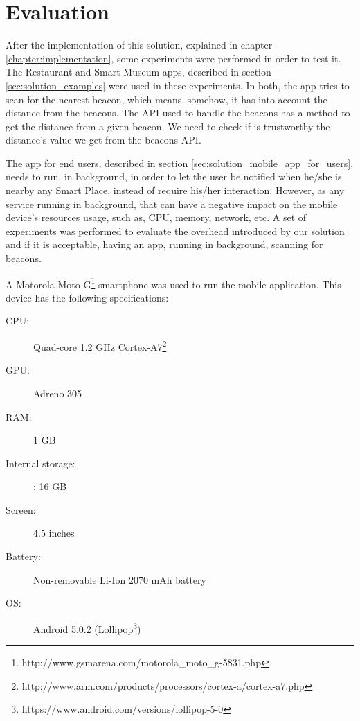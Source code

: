 
\chapter{Evaluation}
\label{chapter:evaluation}

After the implementation of this solution, explained in chapter \ref{chapter:implementation}, some experiments were performed in order to test it.
The Restaurant and Smart Museum apps, described in section \ref{sec:solution_examples} were used in these experiments. In both, the app tries to scan for the nearest beacon, which means, somehow, it has into account the distance from the beacons. The \gls{API} used to handle the beacons has a method to get the distance from a given beacon.
We need to check if is trustworthy the distance's value we get from the beacons \gls{API}.

The app for end users, described in section \ref{sec:solution_mobile_app_for_users}, needs to run, in background, in order to let the user be notified when he/she is nearby any Smart Place, instead of require his/her interaction. However, as any service running in background, that can have a negative impact on the mobile device's resources usage, such as, \gls{CPU}, memory, network, etc.
A set of experiments was performed to evaluate the overhead introduced by our solution and if it is acceptable, having an app, running in background, scanning for beacons.

A Motorola\texttrademark
Moto G\footnote{http://www.gsmarena.com/motorola\_moto\_g-5831.php} smartphone was used to run the mobile application. This device has the following specifications:
\begin{description}
  \item[\gls{CPU}:] Quad-core 1.2 GHz Cortex-A7\footnote{http://www.arm.com/products/processors/cortex-a/cortex-a7.php}
  \item[\gls{GPU}:] Adreno 305
  \item[\gls{RAM}:] 1 \gls{GB}
  \item[Internal storage:]: 16 \gls{GB}
  \item[Screen:] 4.5 inches
  \item[Battery:] Non-removable Li-Ion 2070 \gls{mAh} battery
  \item[\gls{OS}:] Android 5.0.2 (Lollipop\footnote{https://www.android.com/versions/lollipop-5-0})
\end{description}

